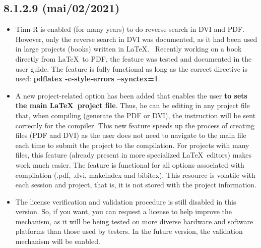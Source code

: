 \subsection*{8.1.2.9 (mai/02/2021)}
\begin{itemize}
  \item Tinn-R is enabled (for many years) to do reverse search in DVI and PDF. 
    However, only the reverse search in DVI was documented, as it had been used 
    in large projects (books) written in \LaTeX. ~Recently working on a book directly
    from \LaTeX ~to PDF, the feature was tested and documented in the user guide.
    The feature is fully functional as long as the correct directive is used: 
    \textbf{pdflatex -c-style-errors --synctex=1}.
  \item A new project-related option has been added that enables the user  
    \textbf{to sets the main \LaTeX ~project file}. Thus, he can be editing in any project
    file that, when compiling (generate the PDF or DVI), the instruction will be sent correctly
    for the compiler. This new feature speeds up the process of creating files (PDF and DVI) 
    as the user does not need to navigate to the main file each time to submit the project 
    to the compilation. For projects with many files, this feature (already present in more 
    specialized \LaTeX ~editors) makes work much easier. The feature is functional for all options
    associated with compilation (.pdf, .dvi, makeindex and bibitex). This resource is volatile
    with each session and project, that is, it is not stored with the project information.
  \item The license verification and validation procedure is still disabled in this version.
    So, if you want, you can request a license to help improve the mechanism,
    as it will be being tested on more diverse hardware and software platforms than
    those used by testers. In the future version, the validation mechanism will be enabled.
\end{itemize}

